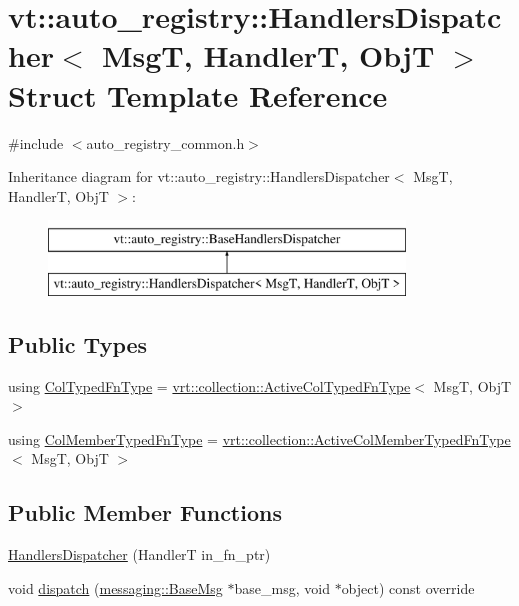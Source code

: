 \hypertarget{structvt_1_1auto__registry_1_1_handlers_dispatcher}{}\section{vt\+:\+:auto\+\_\+registry\+:\+:Handlers\+Dispatcher$<$ MsgT, HandlerT, ObjT $>$ Struct Template Reference}
\label{structvt_1_1auto__registry_1_1_handlers_dispatcher}


{\ttfamily \#include $<$auto\+\_\+registry\+\_\+common.\+h$>$}

Inheritance diagram for vt\+:\+:auto\+\_\+registry\+:\+:Handlers\+Dispatcher$<$ MsgT, HandlerT, ObjT $>$\+:\begin{figure}[H]
\begin{center}
\leavevmode
\includegraphics[height=2.000000cm]{structvt_1_1auto__registry_1_1_handlers_dispatcher}
\end{center}
\end{figure}
\subsection*{Public Types}
\begin{DoxyCompactItemize}
\item 
using \hyperlink{structvt_1_1auto__registry_1_1_handlers_dispatcher_ad45c828eebdd2a18ffc0aa64f542a85c}{Col\+Typed\+Fn\+Type} = \hyperlink{namespacevt_1_1vrt_1_1collection_a939327f58a5838cf9d7dcc7f14d1670c}{vrt\+::collection\+::\+Active\+Col\+Typed\+Fn\+Type}$<$ MsgT, ObjT $>$
\item 
using \hyperlink{structvt_1_1auto__registry_1_1_handlers_dispatcher_a6f1a72ba3eec14527af044a478416b4d}{Col\+Member\+Typed\+Fn\+Type} = \hyperlink{namespacevt_1_1vrt_1_1collection_a87925616c03cf4ccc548d33b2fe172ee}{vrt\+::collection\+::\+Active\+Col\+Member\+Typed\+Fn\+Type}$<$ MsgT, ObjT $>$
\end{DoxyCompactItemize}
\subsection*{Public Member Functions}
\begin{DoxyCompactItemize}
\item 
\hyperlink{structvt_1_1auto__registry_1_1_handlers_dispatcher_aea820469903ae2c06a6e9934d3e8d0cc}{Handlers\+Dispatcher} (HandlerT in\+\_\+fn\+\_\+ptr)
\item 
void \hyperlink{structvt_1_1auto__registry_1_1_handlers_dispatcher_a3139ff15aaf26b383dad67114c785b95}{dispatch} (\hyperlink{structvt_1_1messaging_1_1_base_msg}{messaging\+::\+Base\+Msg} $\ast$base\+\_\+msg, void $\ast$object) const override
\end{DoxyCompactItemize}
